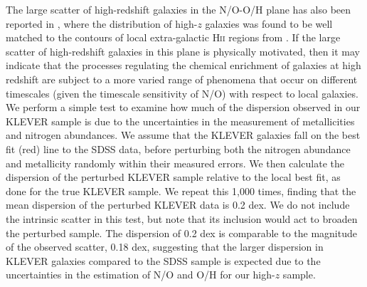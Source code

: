 \documentclass[usenatbib]{mnras} %
\begin{document}
The large scatter of high-redshift galaxies in the N/O-O/H plane has also been reported in \cite{Strom_2018}, where the distribution of high-$z$ galaxies was found to be well matched to the contours of local extra-galactic \textsc{Hii} regions from \cite{Pilyugin_2012}. If the large scatter of high-redshift galaxies in this plane is physically motivated, then it may indicate that the processes regulating the chemical enrichment of galaxies at high redshift are subject to a more varied range of phenomena that occur on different timescales (given the timescale sensitivity of N/O) with respect to local galaxies. We perform a simple test to examine how much of the dispersion observed in our KLEVER sample is due to the uncertainties in the measurement of metallicities and nitrogen abundances. We assume that the KLEVER galaxies fall on the best fit (red) line to the SDSS data, before perturbing both the nitrogen abundance and metallicity randomly within their measured errors. We then calculate the dispersion of the perturbed KLEVER sample relative to the local best fit, as done for the true KLEVER sample. We repeat this 1,000 times, finding that the mean dispersion of the perturbed KLEVER data is 0.2 dex. We do not include the intrinsic scatter in this test, but note that its inclusion would act to broaden the perturbed sample. The dispersion of 0.2 dex is comparable to the magnitude of the observed scatter, 0.18 dex, suggesting that the larger dispersion in KLEVER galaxies compared to the SDSS sample is expected due to the uncertainties in the estimation of N/O and O/H for our high-$z$ sample. 
\end{document}
